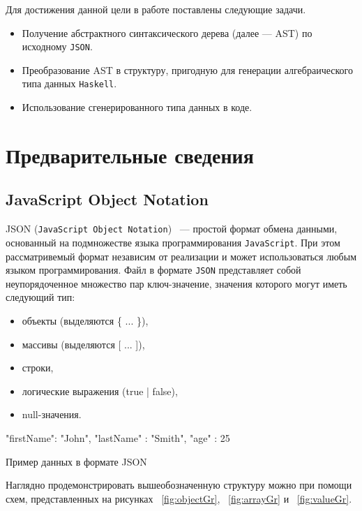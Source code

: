 Для достижения данной цели в работе поставлены следующие задачи.
\begin{itemize}
  \item Получение абстрактного синтаксического дерева (далее --- AST) по исходному \lstinline{JSON}.
  \item Преобразование AST в структуру, пригодную для генерации алгебраического типа данных \lstinline{Haskell}.
  \item Использование сгенерированного типа данных в коде.
\end{itemize}

\chapter{Предварительные сведения}

\section{JavaScript Object Notation}

JSON (\lstinline{JavaScript Object Notation})~\cite{jsonStandart} --- простой формат обмена данными, основанный на подмножестве языка программирования \lstinline{JavaScript}. При этом рассматривемый формат независим от реализации и может использоваться любым языком программирования. Файл в формате \lstinline{JSON} представляет собой неупорядоченное множество пар ключ-значение, значения которого могут иметь следующий тип:  

\begin{itemize}
  \item объекты (выделяются \{ ... \}),
  \item массивы (выделяются [ ... ]),
  \item строки,
  \item логические выражения (true | false),
  \item null-значения.
\end{itemize}

\begin{ListingEnv}[H]
\begin{Verb}
{     
    "firstName": "John",
    "lastName" : "Smith",
    "age" : 25
}
\end{Verb}
\caption{Пример данных в формате JSON}
\label{listing:jsonExample}
\end{ListingEnv}

Наглядно продемонстрировать вышеобозначенную структуру можно при помощи схем, представленных на рисунках ~\ref{fig:objectGr}, ~\ref{fig:arrayGr} и ~\ref{fig:valueGr}.

